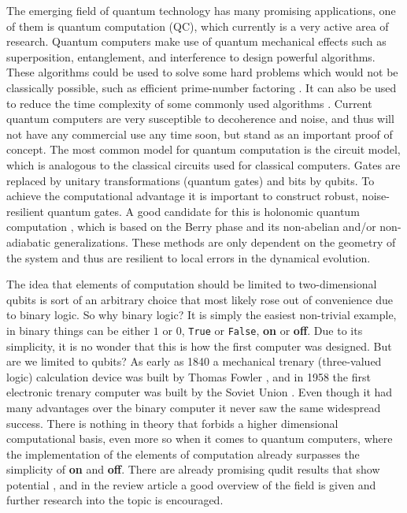 The emerging field of quantum technology has many promising applications, one of them is quantum computation (QC), which currently is a very active area of research. Quantum computers make use of quantum mechanical effects such as superposition, entanglement, and interference to design powerful algorithms. These algorithms could be used to solve some hard problems which would not be classically possible, such as efficient prime-number factoring \cite{shor}. It can also be used to reduce the time complexity of some commonly used algorithms \cite{Grover}. Current quantum computers are very susceptible to decoherence and noise, and thus will not have any commercial use any time soon, but stand as an important proof of concept. 
The most common model for quantum computation is the circuit model, which is analogous to the classical circuits used for classical computers. Gates are replaced by unitary transformations (quantum gates) and bits by qubits. To achieve the computational advantage it is important to construct robust, noise-resilient quantum gates. A good candidate for this is holonomic quantum computation \cite{HQC,NHQC}, which is based on the Berry phase \cite{berry} and its non-abelian and/or non-adiabatic generalizations\cite{anandan1,anandan2,zee}. These methods are only dependent on the geometry of the system and thus are resilient to local errors in the dynamical evolution.


The idea that elements of computation should be limited to two-dimensional qubits is sort of an arbitrary choice that most likely rose out of convenience due to binary logic. So why binary logic? It is simply the easiest non-trivial example, in binary things can be either $1$ or $0$, {\tt True} or {\tt False}, \textbf{on} or \textbf{off}. Due to its simplicity, it is no wonder that this is how the first computer was designed. But are we limited to qubits? As early as 1840 a mechanical trenary (three-valued logic) calculation device was built by Thomas Fowler \cite{tricalc}, and in 1958 the first electronic trenary computer was built by the Soviet Union \cite{setun}. Even though it had many advantages over the binary computer it never saw the same widespread success. There is nothing in theory that forbids a higher dimensional computational basis, even more so when it comes to quantum computers, where the implementation of the elements of computation already surpasses the simplicity of \textbf{on} and \textbf{off}. There are already promising qudit results that show potential \cite{qutrit1,qudit2,qudit3}, and in the review article \cite{qudit} a good overview of the field is given and further research into the topic is encouraged.

